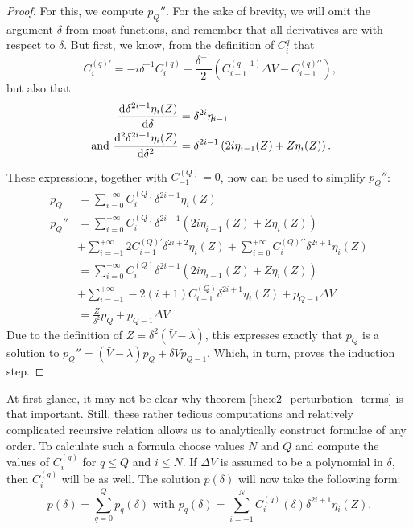 \begin{proof}
For this, we compute $p_Q''$. For the sake of brevity, we will omit the argument $\delta$ from most functions, and remember that all derivatives are with respect to $\delta$. But first, we know, from the definition of $C_i^q$ that
$$
    C_i^{(q)\prime} = -i \delta^{-1} C_i^{(q)} + \frac{\delta^{-1}}{2}\left(C^{(q-1)}_{i-1}\Delta V - C^{(q)\prime\prime}_{i-1}\right)\text{,}
$$
but also that
\begin{align*}
    {\dv[]{\delta^{2i+1}\eta_i(Z)}{\delta}}               & = \delta^{2i} \eta_{i-1}                                         \\
    \text{ and } {\dv[2]{\delta^{2i+1}\eta_i(Z)}{\delta}} & = \delta^{2i-1}\left(2i\eta_{i-1}(Z) + Z\eta_i(Z)\right)\text{.}
\end{align*}

\begingroup
\allowdisplaybreaks
These expressions, together with $C_{-1}^{(Q)} = 0$, now can be used to simplify $p_Q''$:
\begin{align*}
    p_Q   & = \sum_{i=0}^{+\infty} C_{i}^{(Q)} \delta^{2i + 1} \eta_{i}(Z)                                                                            \\
    p_Q'' & = \sum_{i=0}^{+\infty} C_i^{(Q)}\delta^{2i-1}\left(2i\eta_{i-1}(Z) + Z\eta_i(Z)\right)                                                    \\
          & + \sum_{i=-1}^{+\infty} 2C_{i+1}^{(Q)\prime}\delta^{2i+2}\eta_{i}(Z) + \sum_{i=0}^{+\infty} C_i^{(Q)\prime\prime}\delta^{2i+1}\eta_{i}(Z) \\
          & = \sum_{i=0}^{+\infty} C_i^{(Q)}\delta^{2i-1}\left(2i\eta_{i-1}(Z) + Z\eta_i(Z)\right)                                                    \\
          & + \sum_{i=-1}^{+\infty} -2(i+1)C_{i+1}^{(Q)}\delta^{2i+1}\eta_{i}(Z) + p_{Q-1} \Delta V                                                   \\
          & = \frac{Z}{\delta^2}p_Q + p_{Q-1} \Delta V \text{.}
\end{align*}
\endgroup
Due to the definition of $Z = \delta^2(\bar{V} - \lambda)$, this expresses exactly that $p_Q$ is a solution to $p_Q'' = (\bar{V} - \lambda)p_Q + \delta V p_{Q-1}$. Which, in turn, proves the induction step.
\end{proof}

At first glance, it may not be clear why theorem \ref{the:c2_perturbation_terms} is that important. Still, these rather tedious computations and relatively complicated recursive relation allows us to analytically construct formulae of any order. To calculate such a formula choose values $N$ and $Q$ and compute the values of $C_{i}^{(q)}$ for $q \leq Q$ and $i \leq N$. If $\Delta V$ is assumed to be a polynomial in $\delta$, then $C_{i}^{(q)}$ will be as well. The solution $p(\delta)$ will now take the following form:
$$
    p(\delta) = \sum_{q=0}^{Q} p_q(\delta) \text{ with } p_q(\delta) = \sum_{i=-1}^{N} C_{i}^{(q)}(\delta) \delta^{2i+1} \eta_i(Z) \text{.}
$$


